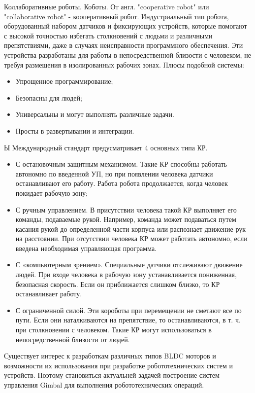 Коллаборативные роботы. Коботы. От англ. "cooperative robot" или
"collaborative robot" - кооперативный робот. Индустриальный тип робота, оборудованный набором датчиков и фиксирующих устройств, которые помогают с высокой точностью избегать столкновений с людьми и различными препятствиями, даже в случаях неисправности программного обеспечения. Эти устройства разработаны для работы в непосредственной близости с человеком, не требуя размещения в изолированных рабочих зонах.
Плюсы подобной системы:
\begin{itemize}
	\item Упрощенное программирование;
	\item Безопасны для людей;
	\item Универсальны и могут выполнять различные задачи. 
	\item Просты в развертывании и интеграции.
\end{itemize}
Ы
Международный стандарт предусматривает 4 основных типа КР.
\begin{itemize}
	\item  С остановочным защитным механизмом. Такие КР способны работать автономно по введенной УП, но при появлении человека датчики останавливают его работу. Работа робота продолжается, когда человек покидает рабочую зону;
	\item С ручным управлением. В присутствии человека такой КР выполняет его команды, подаваемые рукой. Например, команда может подаваться путем касания рукой до определенной части корпуса или распознает движение рук на расстоянии. При отсутствии человека КР может работать автономно, если введена необходимая управляющая программа.
	\item  С «компьютерным зрением». Специальные датчики отслеживают движение людей. При входе человека в рабочую зону устанавливается пониженная, безопасная скорость. Если он приближается слишком близко, то КР останавливает работу.
	\item С ограниченной силой. Эти короботы при перемещении не сметают все по пути. Если они наталкиваются на препятствие, то останавливаются, в т. ч. при столкновении с человеком. Такие КР могут использоваться в непосредственной близости от людей.
\end{itemize}
   
    
    
    



Существует интерес к разработкам различных типов BLDC моторов и возможности их использования при разработке робототехнических систем и устройств. Поэтому становиться актуальней задачей построение систем управления Gimbal для выполнения робототехнических операций.




